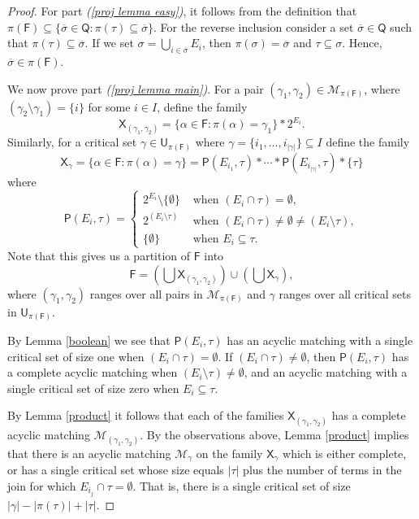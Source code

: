 \documentclass[10pt]{amsart}
\newcommand{\MM}{\mathcal{M}}
\theoremstyle{definition}
\begin{document}
	\begin{proof} For part {\em (\ref{proj lemma easy})}, it follows from the definition that $\pi(\mathsf{F}) \subseteq \{\overline{\sigma}\in \mathsf{Q}: \pi(\tau) \subseteq \overline{\sigma}\}$. For the reverse inclusion
		consider a set $\overline{\sigma}\in \mathsf{Q}$ such that $\pi(\tau)\subseteq \overline{\sigma}$.
		If we set $\sigma=\bigcup_{i\in \overline{\sigma}}E_i$, then $\pi(\sigma)=\overline{\sigma}$ and $\tau \subseteq \sigma$. 
		Hence, $\overline{\sigma}\in \pi(\mathsf{F})$.
		
		We now prove part {\em (\ref{proj lemma main})}. For a pair $(\gamma_1, \gamma_2) \in \MM_{\pi(\mathsf{F})}$, where $(\gamma_2\setminus \gamma_1) = \{i\}$ for some $i\in I$, define the family
		\[\mathsf{X}_{(\gamma_1, \gamma_2)}=\{\alpha \in \mathsf{F}: \pi(\alpha)=\gamma_1\}*2^{E_i}.\]
		Similarly, for a critical set $\gamma \in \mathsf{U}_{\pi(\mathsf{F})}$ where $\gamma = 
		\{i_1,\dots, i_{|\gamma|}\}\subseteq I$ define the family 
		\[\mathsf{X}_\gamma=\{\alpha \in \mathsf{F}: \pi(\alpha)=\gamma\}= \mathsf{P}(E_{i_1},\tau)*\cdots *\mathsf{P}(E_{i_{|\gamma|}},\tau) *\{\tau\}\]
		where 
		\[\mathsf{P}(E_i,\tau) = 
		\begin{cases}
		2^{E_i}\setminus \{\emptyset \} & \text{ when } (E_i \cap \tau) = \emptyset,\\
		2^{(E_i\setminus \tau)} & \text{ when } (E_i\cap \tau) \neq \emptyset \neq (E_i \setminus \tau),\\
		\{\emptyset\} & \text{ when } E_i\subseteq \tau.
		\end{cases}\]
		Note that this gives us a partition of $\mathsf{F}$ into  \[\mathsf{F} = ( \textstyle{\bigcup} \mathsf{X}_{(\gamma_1,\gamma_2)}) \cup ( \textstyle{\bigcup} \mathsf{X}_{\gamma} ),\] where $(\gamma_1, \gamma_2)$ ranges over all pairs in $\MM_{\pi(\mathsf{F})}$ and $\gamma$ ranges over all critical sets in $\mathsf{U}_{\pi(\mathsf{F})}$. 
		
		By Lemma \ref{boolean} we see that $\mathsf{P}(E_i, \tau)$ has an acyclic matching with a single critical set of size one when  $(E_i\cap \tau) = \emptyset$. 
		If $(E_i\cap \tau)\neq \emptyset$, then $\mathsf{P}(E_i, \tau)$ has a complete acyclic matching when $(E_i\setminus \tau) \neq \emptyset$, and an acyclic matching with a single critical set of size zero when $E_i\subseteq \tau$.
		
		By Lemma \ref{product} it follows that each of the families $\mathsf{X}_{(\gamma_1, \gamma_2)}$ has a complete acyclic matching $\MM_{(\gamma_1, \gamma_2)}$. 
		By the observations above, Lemma \ref{product} implies that there is an acyclic matching $\MM_\gamma$ on the family $\mathsf{X}_\gamma$ which is either complete, or has a single critical set whose size equals $|\tau|$ plus the number of terms in the join for which $E_{i_j}\cap \tau=\emptyset$. That is, there is a single critical set of size  $|\gamma|-|\pi(\tau)|+|\tau|$.
		

\end{proof}
\end{document}
